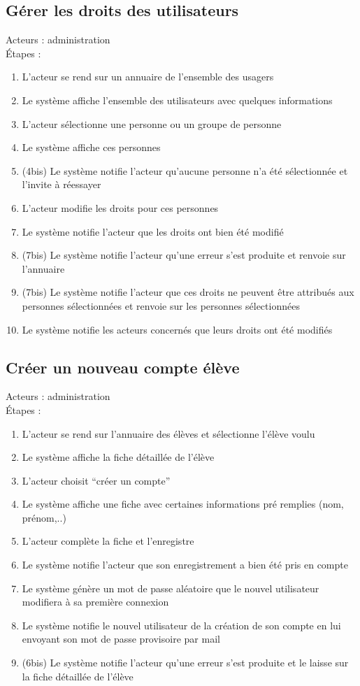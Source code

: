 \documentclass{scrreprt}
\begin{document}
\subsection{Gérer les droits des utilisateurs}
Acteurs : administration
\\
\'Etapes :
\begin{enumerate}
\item L’acteur se rend sur un annuaire de l’ensemble des usagers
\item Le système affiche l’ensemble des utilisateurs avec quelques informations
\item L’acteur sélectionne une personne ou un groupe de personne
\item Le système affiche ces personnes
\item (4bis) Le système notifie l’acteur qu’aucune personne n’a été sélectionnée et l'invite à réessayer
\item L’acteur modifie les droits pour ces personnes
\item Le système notifie l’acteur que les droits ont bien été modifié
\item (7bis) Le système notifie l’acteur qu’une erreur s’est produite et renvoie sur l’annuaire
\item (7bis) Le système notifie l’acteur que ces droits ne peuvent être attribués aux personnes sélectionnées et renvoie sur les personnes sélectionnées
\item Le système notifie les acteurs concernés que leurs droits ont été modifiés
\end{enumerate}
\subsection{Créer un nouveau compte élève}
Acteurs : administration
\\
\'Etapes :
\begin{enumerate}
\item L’acteur se rend sur l’annuaire des élèves et sélectionne l’élève voulu
\item Le système affiche la fiche détaillée de l’élève
\item L’acteur choisit “créer un compte”
\item Le système affiche une fiche avec certaines informations pré remplies (nom, prénom,..)
\item L’acteur complète la fiche et l’enregistre 
\item Le système notifie l’acteur que son enregistrement a bien été pris en compte
\item Le système génère un mot de passe aléatoire que le nouvel utilisateur modifiera à sa première connexion
\item Le système notifie le nouvel utilisateur de la création de son compte en lui envoyant son mot de passe provisoire par mail
\item (6bis) Le système notifie l’acteur qu’une erreur s’est produite et le laisse sur la fiche détaillée de l’élève
\end{enumerate}
\newpage
\end{document}
